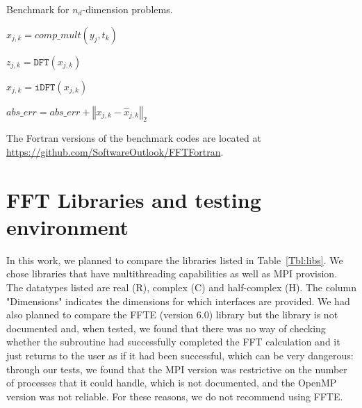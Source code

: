 \documentclass[a4paper]{article}
\newcommand{\norm}[1]{\left\Vert#1\right\Vert}
\begin{document}
\begin{algorithm}\caption{Benchmark for $n_d$-dimension problems. }\label{Alg:Bench}
\noindent \hrulefill

\begin{algorithmic}



\STATE $x_{j,k} = comp\_mult(y_j,t_k)$

\ENDFOR

\ENDFOR






\STATE $z_{j,k} = \texttt{DFT}(x_{j,k})$

\ENDFOR
\ENDFOR








\STATE $\hat{x}_{j,k} = \texttt{iDFT}(x_{j,k})$

\STATE $abs\_err = abs\_err + \norm{x_{j,k}-\hat{x}_{j,k}}_2$

\ENDFOR
\ENDFOR
\ENDIF



\end{algorithmic}
\noindent \hrulefill

\end{algorithm}

The Fortran versions of the benchmark codes are located at \url{https://github.com/SoftwareOutlook/FFTFortran}.


\section{FFT Libraries and testing environment}\label{Sec:libs}

In this work, we planned to compare the libraries listed in
Table~\ref{Tbl:libs}. We chose libraries that have multithreading
capabilities as well as MPI provision.  The datatypes listed are real
(R), complex (C) and half-complex (H). The column "Dimensions"
indicates the dimensions for which interfaces are provided.  We had
also planned to compare the FFTE (version 6.0) library but the library
is not documented and, when tested, we found that there was no way of
checking whether the subroutine had successfully completed the FFT
calculation and it just returns to the user as if it had been
successful, which can be very dangerous: through our tests, we found
that the MPI version was restrictive on the number of processes that
it could handle, which is not documented, and the OpenMP version was
not reliable. For these reasons, we do not recommend using FFTE.
\end{document}
